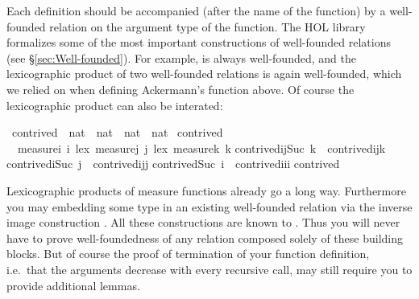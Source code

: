 \begin{isabellebody}
\begin{isamarkuptext}
Each  definition should be accompanied (after the name of
the function) by a well-founded relation on the argument type of the
function.  The HOL library formalizes some of the most important
constructions of well-founded relations (see \S\ref{sec:Well-founded}). For
example,  is always well-founded, and the lexicographic
product of two well-founded relations is again well-founded, which we relied
on when defining Ackermann's function above.
Of course the lexicographic product can also be interated:%
\end{isamarkuptext}%
\ contrived\ {\isacharcolon}{\isacharcolon}\ {\isachardoublequote}nat\ {\isasymtimes}\ nat\ {\isasymtimes}\ nat\ {\isasymRightarrow}\ nat{\isachardoublequote}\isanewline
{}\ contrived\isanewline
\ \ {\isachardoublequote}measure{\isacharparenleft}{\isasymlambda}i{\isachardot}\ i{\isacharparenright}\ {\isacharless}{\isacharasterisk}lex{\isacharasterisk}{\isachargreater}\ measure{\isacharparenleft}{\isasymlambda}j{\isachardot}\ j{\isacharparenright}\ {\isacharless}{\isacharasterisk}lex{\isacharasterisk}{\isachargreater}\ measure{\isacharparenleft}{\isasymlambda}k{\isachardot}\ k{\isacharparenright}{\isachardoublequote}\isanewline
{\isachardoublequote}contrived{\isacharparenleft}i{\isacharcomma}j{\isacharcomma}Suc\ k{\isacharparenright}\ {\isacharequal}\ contrived{\isacharparenleft}i{\isacharcomma}j{\isacharcomma}k{\isacharparenright}{\isachardoublequote}\isanewline
{\isachardoublequote}contrived{\isacharparenleft}i{\isacharcomma}Suc\ j{\isacharcomma}{}{\isacharparenright}\ {\isacharequal}\ contrived{\isacharparenleft}i{\isacharcomma}j{\isacharcomma}j{\isacharparenright}{\isachardoublequote}\isanewline
{\isachardoublequote}contrived{\isacharparenleft}Suc\ i{\isacharcomma}{}{\isacharcomma}{}{\isacharparenright}\ {\isacharequal}\ contrived{\isacharparenleft}i{\isacharcomma}i{\isacharcomma}i{\isacharparenright}{\isachardoublequote}\isanewline
{\isachardoublequote}contrived{\isacharparenleft}{}{\isacharcomma}{}{\isacharcomma}{}{\isacharparenright}\ \ \ \ \ {\isacharequal}\ {}{\isachardoublequote}%
\begin{isamarkuptext}%
Lexicographic products of measure functions already go a long
way. Furthermore you may embedding some type in an
existing well-founded relation via the inverse image construction . All these constructions are known to . Thus you
will never have to prove well-foundedness of any relation composed
solely of these building blocks. But of course the proof of
termination of your function definition, i.e.\ that the arguments
decrease with every recursive call, may still require you to provide
additional lemmas.


\end{isamarkuptext}
\end{isabellebody}
